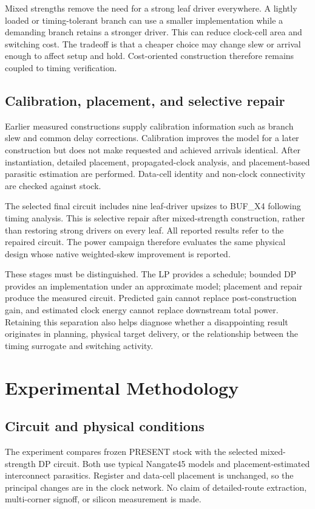 \documentclass[conference]{IEEEtran}
\begin{document}
Mixed strengths remove the need for a strong leaf driver everywhere. A lightly loaded or timing-tolerant branch can use a smaller implementation while a demanding branch retains a stronger driver. This can reduce clock-cell area and switching cost. The tradeoff is that a cheaper choice may change slew or arrival enough to affect setup and hold. Cost-oriented construction therefore remains coupled to timing verification.

\subsection{Calibration, placement, and selective repair}
Earlier measured constructions supply calibration information such as branch slew and common delay corrections. Calibration improves the model for a later construction but does not make requested and achieved arrivals identical. After instantiation, detailed placement, propagated-clock analysis, and placement-based parasitic estimation are performed. Data-cell identity and non-clock connectivity are checked against stock.

The selected final circuit includes nine leaf-driver upsizes to BUF\_X4 following timing analysis. This is selective repair after mixed-strength construction, rather than restoring strong drivers on every leaf. All reported results refer to the repaired circuit. The power campaign therefore evaluates the same physical design whose native weighted-skew improvement is reported.

These stages must be distinguished. The LP provides a schedule; bounded DP provides an implementation under an approximate model; placement and repair produce the measured circuit. Predicted gain cannot replace post-construction gain, and estimated clock energy cannot replace downstream total power. Retaining this separation also helps diagnose whether a disappointing result originates in planning, physical target delivery, or the relationship between the timing surrogate and switching activity.

\section{Experimental Methodology}
\subsection{Circuit and physical conditions}
The experiment compares frozen PRESENT stock with the selected mixed-strength DP circuit. Both use typical Nangate45 models and placement-estimated interconnect parasitics. Register and data-cell placement is unchanged, so the principal changes are in the clock network. No claim of detailed-route extraction, multi-corner signoff, or silicon measurement is made.
\end{document}
